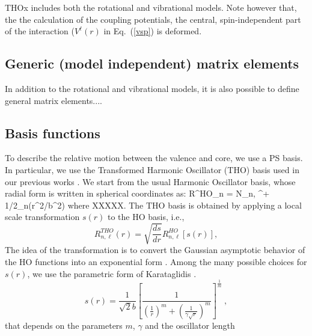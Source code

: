 \documentclass[preprint,12pt]{elsarticle}
\begin{document}
THOx includes both the rotational and vibrational models. Note however that, the the calculation of the coupling potentials, the central, spin-independent part of the interaction ($V^{\ell}(r)$ in Eq.~(\ref{vsp}) is deformed. 

\subsection{Generic (model independent) matrix elements} 
In addition to the rotational and vibrational models, it is also possible to define general matrix elements....


\subsection{Basis functions} 
To describe the relative motion between the valence and core, we use a PS basis. In particular,
 we use the Transformed Harmonic Oscillator (THO) basis used in our previous works  
\cite{Mor09,Lay12}. We start from the usual Harmonic Oscillator basis, whose radial form is written in spherical coordinates as:
\be
R^{HO}_{n \ell } = {\cal N}_{n, \ell} \exp{}^{\ell + 1/2}_{n}(r^2/b^2)
\label{eq:ho}
\ee
where XXXXX. The THO basis is obtained by applying a local scale transformation $s(r)$ to the HO basis, i.e.,
\begin{equation}
\label{eq:tho}
R^{THO}_{n, \ell}(r)= \sqrt{\frac{ds}{dr}} R^{HO} _{n, \ell}[s(r)],
\end{equation}
The idea of the transformation is to convert the Gaussian asymptotic behavior of the HO functions into an exponential
 form \cite{SP88,PS91}. Among the many possible choices for $s(r)$, we use the parametric 
form of Karataglidis \etal \cite{Amos}. 
\begin{equation}
\label{lstamos}
s(r)  = \frac{1}{\sqrt{2} b} \left[  \frac{1}{   \left(  \frac{1}{r}
    \right)^m  +  \left( 
\frac{1}{\gamma\sqrt{r}} \right)^m } \right]^{\frac{1}{m}}\ ,
\end{equation}
that depends on the parameters $m$, $\gamma$ and the oscillator length
\end{document}
